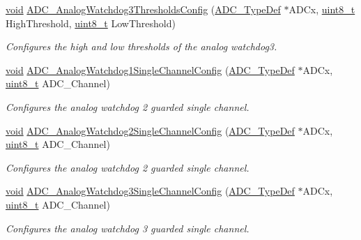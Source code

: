 \begin{DoxyCompactItemize}
\hyperlink{group___n_a_m_e_ga18028b8badbf1ea7e704ccac3c488e82}{void} \hyperlink{group___a_d_c___exported___constants_ga91a42302f54ef2ff3a8dac610552a09f}{A\-D\-C\-\_\-\-Analog\-Watchdog3\-Thresholds\-Config} (\hyperlink{struct_a_d_c___type_def}{A\-D\-C\-\_\-\-Type\-Def} $\ast$A\-D\-Cx, \hyperlink{stdint_8h_aba7bc1797add20fe3efdf37ced1182c5}{uint8\-\_\-t} High\-Threshold, \hyperlink{stdint_8h_aba7bc1797add20fe3efdf37ced1182c5}{uint8\-\_\-t} Low\-Threshold)
\begin{DoxyCompactList}\small\item\em Configures the high and low thresholds of the analog watchdog3. \end{DoxyCompactList}\item 
\hyperlink{group___n_a_m_e_ga18028b8badbf1ea7e704ccac3c488e82}{void} \hyperlink{group___a_d_c___exported___constants_gabbb363d51e4e9619d0dc56ec8aea4eca}{A\-D\-C\-\_\-\-Analog\-Watchdog1\-Single\-Channel\-Config} (\hyperlink{struct_a_d_c___type_def}{A\-D\-C\-\_\-\-Type\-Def} $\ast$A\-D\-Cx, \hyperlink{stdint_8h_aba7bc1797add20fe3efdf37ced1182c5}{uint8\-\_\-t} A\-D\-C\-\_\-\-Channel)
\begin{DoxyCompactList}\small\item\em Configures the analog watchdog 2 guarded single channel. \end{DoxyCompactList}\item 
\hyperlink{group___n_a_m_e_ga18028b8badbf1ea7e704ccac3c488e82}{void} \hyperlink{group___a_d_c___exported___constants_gabb97230a71c5946b5be2eb0cd90b4c82}{A\-D\-C\-\_\-\-Analog\-Watchdog2\-Single\-Channel\-Config} (\hyperlink{struct_a_d_c___type_def}{A\-D\-C\-\_\-\-Type\-Def} $\ast$A\-D\-Cx, \hyperlink{stdint_8h_aba7bc1797add20fe3efdf37ced1182c5}{uint8\-\_\-t} A\-D\-C\-\_\-\-Channel)
\begin{DoxyCompactList}\small\item\em Configures the analog watchdog 2 guarded single channel. \end{DoxyCompactList}\item 
\hyperlink{group___n_a_m_e_ga18028b8badbf1ea7e704ccac3c488e82}{void} \hyperlink{group___a_d_c___exported___constants_gaa2b6ac9933fb3d68cf83791afc555427}{A\-D\-C\-\_\-\-Analog\-Watchdog3\-Single\-Channel\-Config} (\hyperlink{struct_a_d_c___type_def}{A\-D\-C\-\_\-\-Type\-Def} $\ast$A\-D\-Cx, \hyperlink{stdint_8h_aba7bc1797add20fe3efdf37ced1182c5}{uint8\-\_\-t} A\-D\-C\-\_\-\-Channel)
\begin{DoxyCompactList}\small\item\em Configures the analog watchdog 3 guarded single channel. \end{DoxyCompactList}\item 

\end{DoxyCompactItemize}
